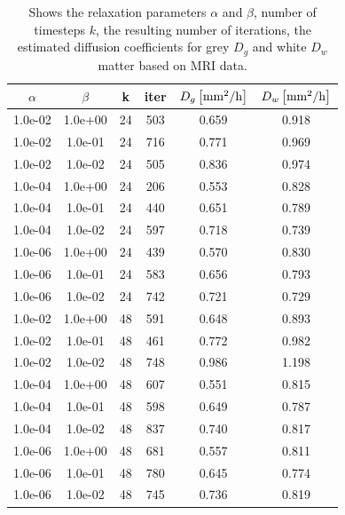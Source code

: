 \documentclass[11pt,a4paper]{article}
\begin{document}
\begin{table}
\centering
\caption{Shows the relaxation parameters $\alpha$ and $\beta$, number of timesteps $k$, the resulting number of iterations, the estimated diffusion coefficients for grey $D_g$ and white $D_w$ matter based on MRI data.}
\begin{tabular}{*{6}c}
$\alpha$ & $\beta$ & k & iter &  $ D_{g} \left[ \mathrm{mm\sp{2}/h} \right] $ & $ D_{w} \left[ \mathrm{mm\sp{2}/h} \right]$ \\
\hline
 1.0e-02 	 & 1.0e+00 	 & 24 & 503 	 & 0.659 & 0.918 \\ 
 1.0e-02 	 & 1.0e-01 	 & 24 & 716 	 & 0.771 & 0.969 \\ 
 1.0e-02 	 & 1.0e-02 	 & 24 & 505 	 & 0.836 & 0.974 \\ 
 1.0e-04 	 & 1.0e+00 	 & 24 & 206 	 & 0.553 & 0.828 \\ 
 1.0e-04 	 & 1.0e-01 	 & 24 & 440 	 & 0.651 & 0.789 \\ 
 1.0e-04 	 & 1.0e-02 	 & 24 & 597 	 & 0.718 & 0.739 \\ 
 1.0e-06 	 & 1.0e+00 	 & 24 & 439 	 & 0.570 & 0.830 \\ 
 1.0e-06 	 & 1.0e-01 	 & 24 & 583 	 & 0.656 & 0.793 \\ 
 1.0e-06 	 & 1.0e-02 	 & 24 & 742 	 & 0.721 & 0.729 \\ 
 
 1.0e-02 	 & 1.0e+00 	 & 48 & 591 	 & 0.648 & 0.893 \\ 
 1.0e-02 	 & 1.0e-01 	 & 48 & 461 	 & 0.772 & 0.982 \\ 
 1.0e-02 	 & 1.0e-02 	 & 48 & 748 	 & 0.986 & 1.198 \\ 
 1.0e-04 	 & 1.0e+00 	 & 48 & 607 	 & 0.551 & 0.815 \\ 
 1.0e-04 	 & 1.0e-01 	 & 48 & 598 	 & 0.649 & 0.787 \\ 
 1.0e-04 	 & 1.0e-02 	 & 48 & 837 	 & 0.740 & 0.817 \\
 1.0e-06 	 & 1.0e+00 	 & 48 & 681 	 & 0.557 & 0.811 \\ 
 1.0e-06 	 & 1.0e-01 	 & 48 & 780 	 & 0.645 & 0.774 \\ 
 1.0e-06 	 & 1.0e-02 	 & 48 & 745 	 & 0.736 & 0.819 \\ 



\end{tabular}
\label{Tab::Real-data}
\end{table} 
 
\end{document}
